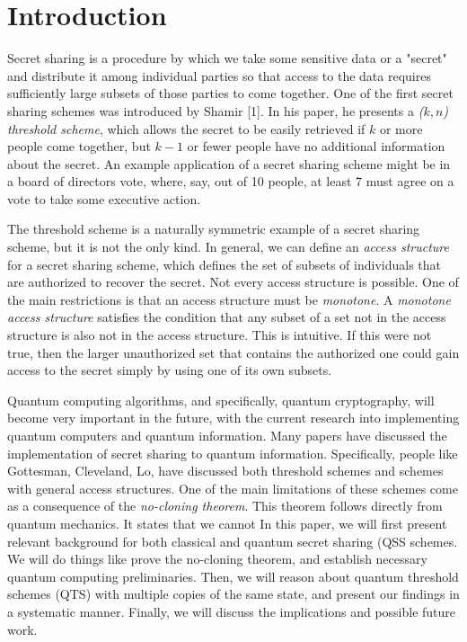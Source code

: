 \chapter{Introduction}

Secret sharing is a procedure by which we take some sensitive data or a "secret" and distribute it among individual parties so that access to the data requires sufficiently large subsets of those parties to come together. One of the first secret sharing schemes was introduced by Shamir [1]. In his paper, he presents a \textit{($k,n$) threshold scheme}, which allows the secret to be easily retrieved if $k$ or more people come together, but $k-1$ or fewer people have no additional information about the secret. An example application of a secret sharing scheme might be in a board of directors vote, where, say, out of 10 people, at least 7 must agree on a vote to take some executive action.

The threshold scheme is a naturally symmetric example of a secret sharing scheme, but it is not the only kind. In general, we can define an \textit{access structure} for a secret sharing scheme, which defines the set of subsets of individuals that are authorized to recover the secret. Not every access structure is possible. One of the main restrictions is that an access structure must be \textit{monotone}. A \textit{monotone access structure} satisfies the condition that any subset of a set not in the access structure is also not in the access structure. This is intuitive. If this were not true, then the larger unauthorized set that contains the authorized one could gain access to the secret simply by using one of its own subsets. 

Quantum computing algorithms, and specifically, quantum cryptography, will become very important in the future, with the current research into implementing quantum computers and quantum information. Many papers have discussed the implementation of secret sharing to quantum information. Specifically, people like Gottesman, Cleveland, Lo, have discussed both threshold schemes and schemes with general access structures. One of the main limitations of these schemes come as a consequence of the \textit{no-cloning theorem}. This theorem follows directly from quantum mechanics. It states that we cannot In this paper, we will first present relevant background for both classical and quantum secret sharing (QSS schemes. We will do things like prove the no-cloning theorem, and establish necessary quantum computing preliminaries. Then, we will reason about quantum threshold schemes (QTS) with multiple copies of the same state, and present our findings in a systematic manner. Finally, we will discuss the implications and possible future work.